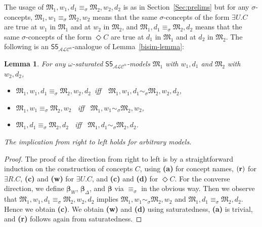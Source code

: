 \documentclass[10pt,a4paper]{amsart}
\theoremstyle{plain}
\newtheorem{lem}[thm]{Lemma}
\theoremstyle{definition}
\newcommand{\bs}{\boldsymbol{\beta}}
\newcommand{\ALCIOS}{\ensuremath{\mathsf{S5}_{\mathcal{ALC}^u}}}
\begin{document}
The usage of $\mathfrak{M}_{1},w_{1},d_{1} \equiv_{\sigma} \mathfrak{M}_{2},w_{2},d_{2}$
is as in Section~\ref{Sec:prelims} but for any $\sigma$-concepts,
$\mathfrak{M}_{1},w_{1}\equiv_{\sigma} \mathfrak{M}_{2},w_{2}$ means that the same $\sigma$-concepts of the form  $\exists U.C$ are true at $w_1$ in $\mathfrak M_1$ and at $w_2$ in $\mathfrak M_2$, 
and $\mathfrak{M}_{1},d_{1}\equiv_{\sigma} \mathfrak{M}_{2},d_{2}$ means that the same $\sigma$-concepts of the form  $\Diamond C$ are true at $d_1$ in $\mathfrak M_1$ and at $d_2$ in $\mathfrak M_2$.
%
%
The following is an $\ALCIOS$-analogue of Lemma~\ref{bisim-lemma}: 

\begin{lem}\label{bisim-lemma-ALC}
	For any $\omega$-saturated $\ALCIOS$-models $\mathfrak{M}_{1}$ with $w_1,d_1$ and $\mathfrak{M}_{2}$ with $w_2,d_2$, 
	\begin{itemize}
		\item[--] \mbox{$\mathfrak{M}_{1},w_{1},d_{1}  \equiv_{\sigma}  \mathfrak{M}_{2},w_{2},d_{2}$ iff \ $\mathfrak{M}_{1},w_{1},d_{1}  \sim_{\sigma} \mathfrak{M}_{2},w_{2},d_{2}$},
		
		\item[--] $\mathfrak{M}_{1},w_{1} \equiv_{\sigma} \mathfrak{M}_{2},w_{2}$ \ iff \ $
		\mathfrak{M}_{1},w_{1} \sim_{\sigma} \mathfrak{M}_{2},w_{2}$,
		
		\item[--] $\mathfrak{M}_{1},d_{1}  \equiv_{\sigma} \mathfrak{M}_{2},d_{2}$ \ iff \ $
		\mathfrak{M}_{1},d_{1}  \sim_{\sigma} \mathfrak{M}_{2},d_{2}$.
	\end{itemize}
	The implication from right to left holds for arbitrary models.
\end{lem}
%
\begin{proof}
	The proof of the direction from right to left is by a straightforward induction on the construction of concepts $C$, using {\bf (a)} for concept names, ${\bf (r)}$ for $\exists R.C$, {\bf (c)} and {\bf (w)} for $\exists U.C$, and {\bf (c)} and {\bf (d)} for $\Diamond C$. 
%	
	For the converse direction, we define $\bs_{W}$, $\bs_{\Delta}$, and $\bs$ via $\equiv_{\sigma}$ in the obvious way. Then we observe that 
	$\mathfrak{M}_{1},w_{1},d_{1}  \equiv_{\sigma} \mathfrak{M}_{2},w_{2},d_{2}$ implies $\mathfrak{M}_{1},w_{1} \sim_{\sigma} \mathfrak{M}_{2},w_{2}$ and
	$\mathfrak{M}_{1},d_{1}  \equiv_{\sigma} \mathfrak{M}_{2},d_{2}$. Hence we obtain {\bf (c)}. We obtain {\bf (w)} and {\bf (d)} using saturatedness, {\bf (a)} is trivial, and {\bf (r)} follows again from saturatedness.
\end{proof}
\end{document}
